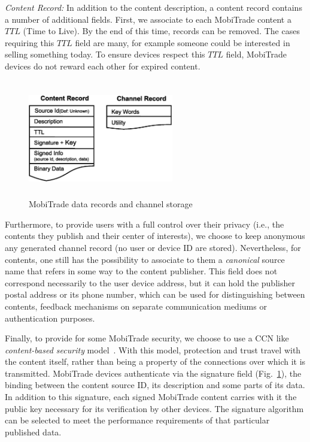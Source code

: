 \emph{Content Record:} In addition to the content description, a content record contains a number of additional fields. First, we associate to each MobiTrade content a $TTL$ (Time to Live). By the end of this time, records can be removed. The cases requiring this $TTL$ field are many, for example someone could be interested in selling something today. To ensure devices respect this $TTL$ field, MobiTrade devices do not reward each other for expired content.

\begin{figure}
\centering
\includegraphics[width=2.5in,height=2in]{Chapitre5/ContentsInterestsRecords.eps}
\vspace{-0.1in}
\caption{MobiTrade data records and channel storage}
\label{records}
\vspace{-0.2in}
\end{figure}

Furthermore, to provide users with a full control over their privacy (i.e., the contents they publish and their center of interests), we choose to keep anonymous any generated channel record (no user or device ID are stored). Nevertheless, for contents, one still has the possibility to associate to them a \emph{canonical} source name that refers in some way to the content publisher. This field does not correspond necessarily to the user device address, but it can hold the publisher postal address or its phone number, which can be used for distinguishing between contents, feedback mechanisms on separate communication mediums or authentication purposes.

Finally, to provide for some MobiTrade security, we choose to use a CCN like \emph{content-based security} model~\cite{CCN}. With this model, protection and trust travel with the content itself, rather than being a property of the connections over which it is transmitted.
MobiTrade devices authenticate via the signature field (Fig.~\ref{records}), the binding between the content source ID, its description and some parts of its data. In addition to this signature, each signed MobiTrade content carries with it the public key necessary for its verification by other devices. The signature algorithm can be selected to meet the performance requirements of that particular published data.

